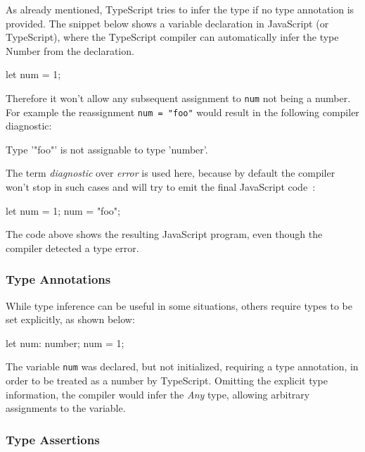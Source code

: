As already mentioned, TypeScript tries to infer the type if no type annotation is provided. The snippet below shows a variable declaration in JavaScript (or TypeScript), where the TypeScript compiler can automatically infer the type Number from the declaration.
\begin{JsCode}[numbers=none]
let num = 1;
\end{JsCode}
Therefore it won't allow any subsequent assignment to \texttt{num} not being a number. For example the reassignment \texttt{num = "foo"} would result in the following compiler diagnostic:
\begin{JsCode}[numbers=none]
Type '"foo"' is not assignable to type 'number'.
\end{JsCode}
The term \emph{diagnostic} over \emph{error} is used here, because by default the compiler won't stop in such cases and will try to emit the final JavaScript code~\cite[p.~12]{TypeScriptBook:Syed:2017}:
\begin{JsCode}[numbers=none]
let num = 1;
num = "foo";
\end{JsCode}
The code above shows the resulting JavaScript program, even though the compiler detected a type error.

\subsubsection{Type Annotations}
\label{sec:ts-type-annotations}

While type inference can be useful in some situations, others require types to be set explicitly, as shown below:
\begin{JsCode}[numbers=none]
let num: number;
num = 1;
\end{JsCode}
The variable \texttt{num} was declared, but not initialized, requiring  a type annotation, in order to be treated as a number by TypeScript. Omitting the explicit type information, the compiler would infer the \emph{Any} type, allowing arbitrary assignments to the variable.

\subsubsection{Type Assertions}
\label{sec:ts-type-assertions}

